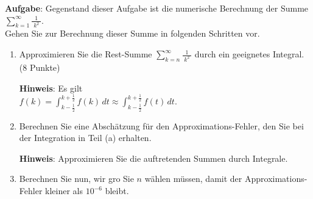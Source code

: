 \documentclass{article}
\newcommand{\bruch}[2]{\displaystyle\frac{\;\displaystyle#1\;}{\;\displaystyle#2\;}}
\begin{document}
\noindent
\textbf{Aufgabe}: Gegenstand dieser Aufgabe ist die numerische Berechnung der Summe 
\\[0.1cm]
\hspace*{1.3cm} $\displaystyle \sum\limits_{k=1}^\infty \bruch{1}{k^2}$.
\\[0.1cm]
Gehen Sie zur Berechnung dieser Summe in folgenden Schritten vor.
\begin{enumerate}
\item Approximieren Sie die Rest-Summe $\sum\limits_{k=n}^\infty \bruch{1}{k^2}$ 
      durch ein geeignetes Integral. 
      \hspace*{\fill} (8 Punkte)

      \textbf{Hinweis}: Es gilt 
      \\[0.1cm]
      \hspace*{1.3cm} $\displaystyle f(k) = \int_{k-\frac{1}{2}}^{k+\frac{1}{2}} f(k) \, dt \approx \int_{k-\frac{1}{2}}^{k+\frac{1}{2}} f(t) \, dt$.
\item Berechnen Sie eine Absch\"atzung f\"ur den Approximations-Fehler,
      den Sie bei der Integration in Teil (a) erhalten.
      
      \textbf{Hinweis}: Approximieren Sie die auftretenden Summen durch Integrale.
\item Berechnen Sie nun, wir gro\3 Sie $n$ w\"ahlen m\"ussen, damit der Approximations-Fehler
      kleiner als $10^{-6}$ bleibt.
\end{enumerate}
\vspace*{0.3cm} 
\end{document}

